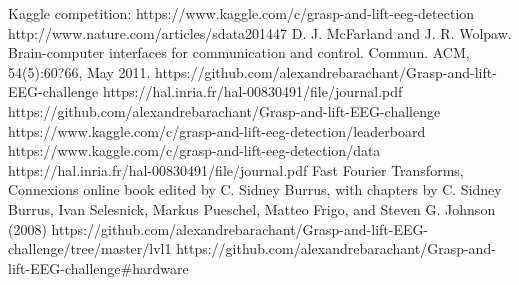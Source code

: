 \documentclass[final,leqno,onefignum,onetabnum]{siamltexmm}
\begin{document}
\begin{thebibliography}{1}
   Kaggle competition:  https://www.kaggle.com/c/grasp-and-lift-eeg-detection
   http://www.nature.com/articles/sdata201447
  D. J. McFarland and J. R. Wolpaw. Brain-computer interfaces for communication and control. Commun. ACM, 54(5):60?66, May 2011.
  https://github.com/alexandrebarachant/Grasp-and-lift-EEG-challenge
  https://hal.inria.fr/hal-00830491/file/journal.pdf
  https://github.com/alexandrebarachant/Grasp-and-lift-EEG-challenge
  https://www.kaggle.com/c/grasp-and-lift-eeg-detection/leaderboard
  https://www.kaggle.com/c/grasp-and-lift-eeg-detection/data
  https://hal.inria.fr/hal-00830491/file/journal.pdf
  Fast Fourier Transforms, Connexions online book edited by C. Sidney Burrus, with chapters by C. Sidney Burrus, Ivan Selesnick, Markus Pueschel, Matteo Frigo, and Steven G. Johnson (2008)
   https://github.com/alexandrebarachant/Grasp-and-lift-EEG-challenge/tree/master/lvl1
   https://github.com/alexandrebarachant/Grasp-and-lift-EEG-challenge\#hardware
\end{thebibliography} 
\end{document}
